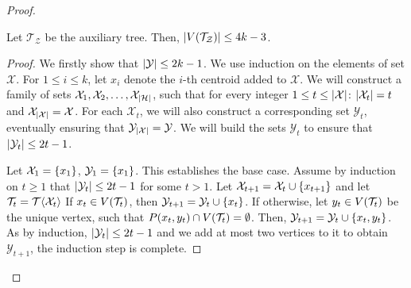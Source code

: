 \begin{theorem}
\begin{proof}
\begin{lemma}\label{lemma:auxTreeSize}
    Let $\mathcal{T}_{\mathcal{Z}}$ be the auxiliary tree. Then, $\mathopen{}\left| V\mathopen{}\left( \mathcal{T}_{\mathcal{Z}} \right) \right|\leq 4k-3$.
    \begin{proof}
        We firstly show that $\mathopen{}\left| \mathcal{Y} \right|\leq 2k-1$. We use induction on the elements of set $\mathcal{X}$. For $1\leq i\leq k$, let $x_i$ denote the $i$-th centroid added to $\mathcal{X}$. We will construct a family of sets $\mathcal{X}_1, \mathcal{X}_2,\dots, \mathcal{X}_{\mathopen{}\left| \mathcal{H} \right|}$, such that for every integer $1\leq t\leq \mathopen{}\left| \mathcal{X} \right|$: $\mathopen{}\left| \mathcal{X}_t \right|=t$ and $\mathcal{X}_{\mathopen{}\left| \mathcal{X} \right|}=\mathcal{X}$. For each $\mathcal{X}_t$, we will also construct a corresponding set $\mathcal{Y}_t$, eventually ensuring that $\mathcal{Y}_{\mathopen{}\left| \mathcal{X} \right|}=\mathcal{Y}$. We will build the sets $\mathcal{Y}_{t}$ to ensure that $\mathopen{}\left| \mathcal{Y}_t \right|\leq 2t-1$. 
        
        Let $\mathcal{X}_1=\mathopen{}\left\{ x_1 \right\}$, $\mathcal{Y}_1=\mathopen{}\left\{ x_1 \right\}$. This establishes the base case. Assume by induction on $t\geq1$ that $\mathopen{}\left| \mathcal{Y}_t \right|\leq 2t-1$ for some $t>1$. Let $\mathcal{X}_{t+1} =\mathcal{X}_{t}\cup \mathopen{}\left\{ x_{t+1} \right\}$ and let $\mathcal{T}_t=\mathcal{T}\mathopen{}\langle \mathcal{X}_{t} \rangle$ If $x_t\in V\mathopen{}\left( \mathcal{T}_t \right)$, then $\mathcal{Y}_{t+1}=\mathcal{Y}_{t}\cup \mathopen{}\left\{ x_t \right\}$. If otherwise, let $y_t \in V\mathopen{}\left( \mathcal{T}_t \right)$ be the unique vertex, such that $P\mathopen{}\left( x_t, y_t \right)\cap V\mathopen{}\left( \mathcal{T}_t \right)=\emptyset$. Then, $\mathcal{Y}_{t+1}=\mathcal{Y}_{t}\cup \mathopen{}\left\{ x_t, y_t \right\}$. As by induction, $\mathopen{}\left| \mathcal{Y}_{t} \right|\leq 2t-1$ and we add at most two vertices to it to obtain $\mathcal{Y}_{t+1}$, the induction step is complete.
        

\end{proof}
\end{lemma}
\end{proof}
\end{theorem}
